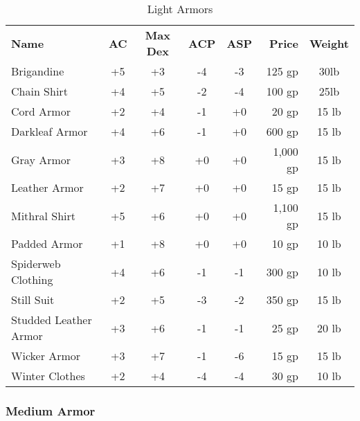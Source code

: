 \begin{table}[htb]
\caption{Light Armors}
\centering
\begin{tabular}{l *{4}{c} r c}
\textbf{Name} & \textbf{AC} & \textbf{Max Dex} & \textbf{ACP} & \textbf{ASP} & \textbf{Price} & \textbf{Weight}\\
Brigandine & +5 & +3 & -4 & -3 & 125 gp & 30lb\\
Chain Shirt & +4 & +5 & -2 & -4 & 100 gp & 25lb\\
Cord Armor & +2 & +4 & -1 & +0 & 20 gp & 15 lb\\
Darkleaf Armor & +4 & +6 & -1 & +0 & 600 gp & 15 lb\\
Gray Armor & +3 & +8 & +0 & +0 & 1,000 gp & 15 lb\\
Leather Armor & +2 & +7 & +0 & +0 & 15 gp & 15 lb\\
Mithral Shirt & +5 & +6 & +0 & +0 & 1,100 gp & 15 lb\\
Padded Armor & +1 & +8 & +0 & +0 & 10 gp & 10 lb\\
Spiderweb Clothing & +4 & +6 & -1 &  -1 & 300 gp & 10 lb\\
Still Suit & +2 & +5 & -3 & -2 & 350 gp & 15 lb\\
Studded Leather Armor & +3 & +6 & -1 & -1 & 25 gp & 20 lb\\
Wicker Armor & +3 & +7 & -1 & -6 & 15 gp & 15 lb\\
Winter Clothes & +2 & +4 & -4 & -4 & 30 gp & 10 lb\\
\end{tabular}
\end{table}


\subsubsection{Medium Armor}

